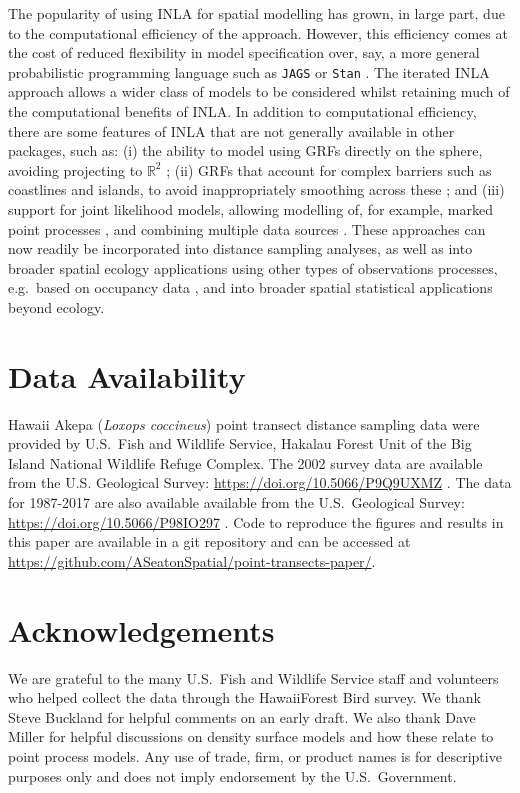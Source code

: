 \documentclass{statsoc}
\newcommand{\hawaii}{Hawai\textquotesingle i}   %
\begin{document}
The popularity of using INLA for spatial modelling has grown, in large part, due to the computational efficiency of the approach.  However, this efficiency comes at the cost of reduced flexibility in model specification over, say, a more general probabilistic programming language such as \texttt{JAGS} \citep{plummer_jags_2017} or \texttt{Stan} \citep{stan_Rstan_2020}.  The iterated INLA approach allows a wider class of models to be considered whilst retaining much of the computational benefits of INLA.  In addition to computational efficiency, there are some features of INLA that are not generally available in other packages, such as: (i) the ability to model using GRFs directly on the sphere, avoiding projecting to $\mathbb{R}^2$ \citep{lindgren_explicit_2011}; (ii) GRFs that account for complex barriers such as coastlines and islands, to avoid inappropriately smoothing across these \citep{bakka_NonstationaryGaussianModels_2019}; and (iii) support for joint likelihood models, allowing modelling of, for example, marked point processes \citep{illian_FittingComplexEcological_2013}, and combining multiple data sources \citep{villejo2025data, martino2021integration}.  These approaches can now readily be incorporated into distance sampling analyses, as well as into broader spatial ecology applications using other types of observations processes, e.g.\ based on occupancy data \citep{belmont2024spatio}, and into broader spatial statistical applications beyond ecology.

\section*{Data Availability}

Hawaii Akepa (\textit{Loxops coccineus}) point transect distance sampling data were provided by U.S.\ Fish and Wildlife Service, Hakalau Forest Unit of the Big Island National Wildlife Refuge Complex. The 2002 survey data are available from the U.S. Geological Survey: \url{https://doi.org/10.5066/P9Q9UXMZ} \citep{camp_datarelease_2002}.  The data for 1987-2017 are also available  available from the U.S.\ Geological Survey: \url{https://doi.org/10.5066/P98IO297} \citep{camp_datarelease_all}. Code to reproduce the figures and results in this paper are available in a git repository and can be accessed at \url{https://github.com/ASeatonSpatial/point-transects-paper/}.

\section*{Acknowledgements}

We are grateful to the many U.S.\ Fish and Wildlife Service staff and volunteers who helped collect the data through the \hawaii Forest Bird survey. We thank Steve Buckland for helpful comments on an early draft.  We also thank Dave Miller for helpful discussions on density surface models and how these relate to point process models.  Any use of trade, firm, or product names is for descriptive purposes only and does not imply endorsement by the U.S.\ Government.

\clearpage


\end{document}
